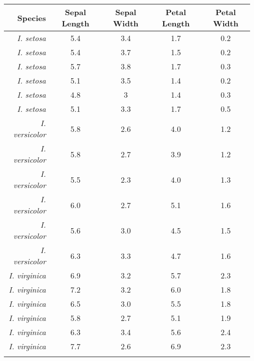 \begin{tabular}{ r c c c c }
Species&Sepal Length&Sepal Width&Petal Length&Petal Width\\\hline
\textit{I. setosa}&5.4&3.4&1.7&0.2\\
\textit{I. setosa}&5.4&3.7&1.5&0.2\\
\textit{I. setosa}&5.7&3.8&1.7&0.3\\
\textit{I. setosa}&5.1&3.5&1.4&0.2\\
\textit{I. setosa}&4.8&3&1.4&0.3\\
\textit{I. setosa}&5.1&3.3&1.7&0.5\\\arrayrulecolor{black!25}\hline
\textit{I. versicolor}&5.8&2.6&4.0&1.2\\
\textit{I. versicolor}&5.8&2.7&3.9&1.2\\
\textit{I. versicolor}&5.5&2.3&4.0&1.3\\
\textit{I. versicolor}&6.0&2.7&5.1&1.6\\
\textit{I. versicolor}&5.6&3.0&4.5&1.5\\
\textit{I. versicolor}&6.3&3.3&4.7&1.6\\\hline
\textit{I. virginica}&6.9&3.2&5.7&2.3\\
\textit{I. virginica}&7.2&3.2&6.0&1.8\\
\textit{I. virginica}&6.5&3.0&5.5&1.8\\
\textit{I. virginica}&5.8&2.7&5.1&1.9\\
\textit{I. virginica}&6.3&3.4&5.6&2.4\\
\textit{I. virginica}&7.7&2.6&6.9&2.3\\\arrayrulecolor{black}\hline
\end{tabular}
